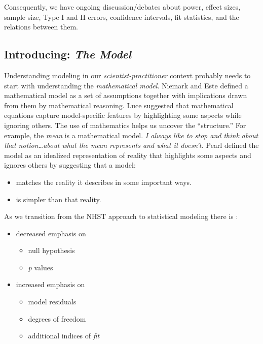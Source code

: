 \documentclass[
  11pt,
]{book}
\providecommand{\tightlist}{%
  \setlength{\itemsep}{0pt}\setlength{\parskip}{0pt}}
\begin{document}
Consequently, we have ongoing discussion/debates about power, effect sizes, sample size, Type I and II errors, confidence intervals, fit statistics, and the relations between them.

\hypertarget{introducing-the-model}{%
\subsection{\texorpdfstring{Introducing: \emph{The Model}}{Introducing: The Model}}\label{introducing-the-model}}

Understanding modeling in our \emph{scientist-practitioner} context probably needs to start with understanding the \emph{mathematical model}. Niemark and Este \citeyearpar{niemark_stimulus_1967} defined a mathematical model as a set of assumptions together with implications drawn from them by mathematical reasoning. Luce \citep{luce_four_1995} suggested that mathematical equations capture model-specific features by highlighting some aspects while ignoring others. The use of mathematics helps us uncover the ``structure.'' For example, the \emph{mean} is a mathematical model. \emph{I always like to stop and think about that notion\ldots about what the mean represents and what it doesn't.} Pearl \citeyearpar{pearl_causality_2000} defined the model as an idealized representation of reality that highlights some aspects and ignores others by suggesting that a model:

\begin{itemize}
\tightlist
\item
  matches the reality it describes in some important ways.
\item
  is simpler than that reality.
\end{itemize}

As we transition from the NHST approach to statistical modeling there is \citep{rodgers_epistemology_2010}:

\begin{itemize}
\tightlist
\item
  decreased emphasis on

  \begin{itemize}
  \tightlist
  \item
    null hypothesis
  \item
    \emph{p} values
  \end{itemize}
\item
  increased emphasis on

  \begin{itemize}
  \tightlist
  \item
    model residuals
  \item
    degrees of freedom
  \item
    additional indices of \emph{fit}
  \end{itemize}
\end{itemize}
\end{document}
